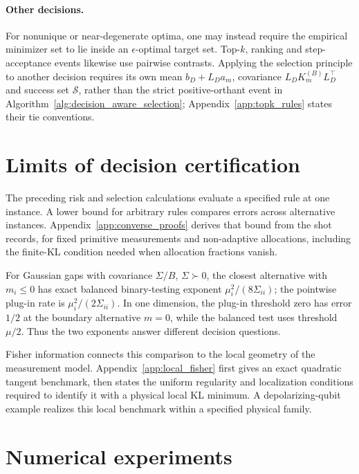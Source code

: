 \documentclass[a4paper,onecolumn,unpublished,nopdfoutputerror]{quantumarticle}
\theoremstyle{plain}
\theoremstyle{definition}
\newcommand{\calS}{\mathcal{S}}
\newcommand{\1}{\mathbf{1}}
\begin{document}
\paragraph{Other decisions.}
For nonunique or near-degenerate optima, one may instead require the empirical minimizer set to lie inside an $\epsilon$-optimal target set. Top-$k$, ranking and step-acceptance events likewise use pairwise contrasts. Applying the selection principle to another decision requires its own mean $b_D+L_Da_m$, covariance $L_DK_m^{(B)}L_D^\top$ and success set $\calS$, rather than the strict positive-orthant event in Algorithm~\ref{alg:decision_aware_selection}; Appendix~\ref{app:topk_rules} states their tie conventions.

\section{Limits of decision certification}
\label{sec:decision_limits}

The preceding risk and selection calculations evaluate a specified rule at one instance. A lower bound for arbitrary rules compares errors across alternative instances. Appendix~\ref{app:converse_proofs} derives that bound from the shot records, for fixed primitive measurements and non-adaptive allocations, including the finite-KL condition needed when allocation fractions vanish.

For Gaussian gaps with covariance $\Sigma/B$, $\Sigma\succ0$, the closest alternative with $m_i\le0$ has exact balanced binary-testing exponent $\mu_i^2/(8\Sigma_{ii})$; the pointwise plug-in rate is $\mu_i^2/(2\Sigma_{ii})$. In one dimension, the plug-in threshold zero has error $1/2$ at the boundary alternative $m=0$, while the balanced test uses threshold $\mu/2$. Thus the two exponents answer different decision questions.

Fisher information connects this comparison to the local geometry of the measurement model. Appendix~\ref{app:local_fisher} first gives an exact quadratic tangent benchmark, then states the uniform regularity and localization conditions required to identify it with a physical local KL minimum. A depolarizing-qubit example realizes this local benchmark within a specified physical family.

\section{Numerical experiments}
\label{sec:numerical_proof_of_mechanism}
\end{document}
